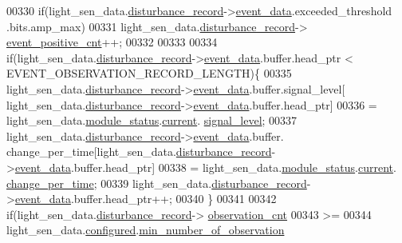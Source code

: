 \begin{DoxyCode}
00330             \textcolor{keywordflow}{if}(light\_sen\_data.\hyperlink{a00024_ac9b38e2c1d3f1013a88d33506c754152}{disturbance\_record}->\hyperlink{a00028_a8c0bda69e71ef674e60da47ad0be9ab0}{event\_data}.exceeded\_threshold
      .bits.amp\_max)
00331                 light\_sen\_data.\hyperlink{a00024_ac9b38e2c1d3f1013a88d33506c754152}{disturbance\_record}->
      \hyperlink{a00028_a7397b9d76d4b57500f27bb23d258a18a}{event\_positive\_cnt}++;
00332 
00333 
00334             \textcolor{keywordflow}{if}(light\_sen\_data.\hyperlink{a00024_ac9b38e2c1d3f1013a88d33506c754152}{disturbance\_record}->\hyperlink{a00028_a8c0bda69e71ef674e60da47ad0be9ab0}{event\_data}.buffer.head\_ptr < 
      EVENT\_OBSERVATION\_RECORD\_LENGTH)\{
00335             light\_sen\_data.\hyperlink{a00024_ac9b38e2c1d3f1013a88d33506c754152}{disturbance\_record}->\hyperlink{a00028_a8c0bda69e71ef674e60da47ad0be9ab0}{event\_data}.buffer.signal\_level[
      light\_sen\_data.\hyperlink{a00024_ac9b38e2c1d3f1013a88d33506c754152}{disturbance\_record}->\hyperlink{a00028_a8c0bda69e71ef674e60da47ad0be9ab0}{event\_data}.buffer.head\_ptr]
00336                     = light\_sen\_data.\hyperlink{a00024_a5a53c391562b059eb744ac679f3765ca}{module\_status}.\hyperlink{a00017_ab8af48cdbba92b3ae39c4470e53af944}{current}.
      \hyperlink{a00017_abcdf2bc0c2e5a14863938ae28c3bc96e}{signal\_level};
00337             light\_sen\_data.\hyperlink{a00024_ac9b38e2c1d3f1013a88d33506c754152}{disturbance\_record}->\hyperlink{a00028_a8c0bda69e71ef674e60da47ad0be9ab0}{event\_data}.buffer.
      change\_per\_time[light\_sen\_data.\hyperlink{a00024_ac9b38e2c1d3f1013a88d33506c754152}{disturbance\_record}->\hyperlink{a00028_a8c0bda69e71ef674e60da47ad0be9ab0}{event\_data}.buffer.head\_ptr]
00338                     = light\_sen\_data.\hyperlink{a00024_a5a53c391562b059eb744ac679f3765ca}{module\_status}.\hyperlink{a00017_ab8af48cdbba92b3ae39c4470e53af944}{current}.
      \hyperlink{a00017_ad5c4f9a39d2a36632a53205ae8eb5a5d}{change\_per\_time};
00339             light\_sen\_data.\hyperlink{a00024_ac9b38e2c1d3f1013a88d33506c754152}{disturbance\_record}->\hyperlink{a00028_a8c0bda69e71ef674e60da47ad0be9ab0}{event\_data}.buffer.head\_ptr++;
00340             \}
00341 
00342               \textcolor{keywordflow}{if}(light\_sen\_data.\hyperlink{a00024_ac9b38e2c1d3f1013a88d33506c754152}{disturbance\_record}->
      \hyperlink{a00028_ad5b0bac02ce266b91b2b52a1c3ea1d78}{observation\_cnt}
00343                 >=
00344                 light\_sen\_data.\hyperlink{a00024_a94b2d1f6ea4ab334c74d24984dd27843}{configured}.\hyperlink{a00021_ae8665e8bf422c1482442d6949ba28408}{min\_number\_of\_observation}

\end{DoxyCode}
